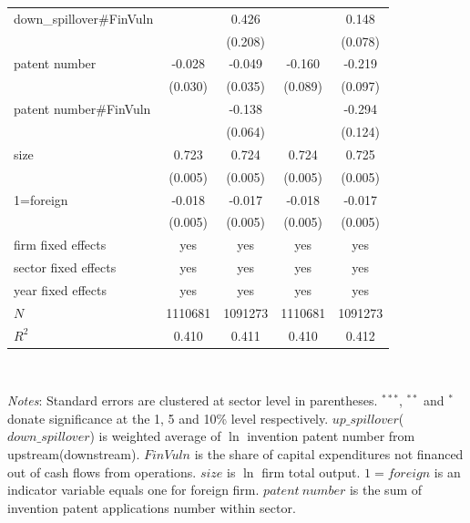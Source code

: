 \documentclass[12pt]{article}%
\begin{document}
\begin{CJK*}{GBK}{fs}
\begin{table}[!h]
{{{\begin{tabular}{l*{4}{c}}
down\_spillover\#FinVuln &            &    0.426\sym{**} &            &     0.148\sym{*} \\

           &            &    (0.208) &            &    (0.078) \\

patent number &     -0.028 &     -0.049 &    -0.160\sym{*} &   -0.219\sym{**} \\

           &    (0.030) &    (0.035) &    (0.089) &    (0.097) \\

patent number\#FinVuln &            &   -0.138\sym{**} &            &   -0.294\sym{**} \\

           &            &    (0.064) &            &    (0.124) \\

      size &   0.723\sym{***} &   0.724\sym{***} &   0.724\sym{***} &   0.725\sym{***} \\

           &    (0.005) &    (0.005) &    (0.005) &    (0.005) \\

 1=foreign &  -0.018\sym{***} &  -0.017\sym{***} &  -0.018\sym{***} &  -0.017\sym{***} \\

           &    (0.005) &    (0.005) &    (0.005) &    (0.005) \\

           \hline
firm fixed effects      &     yes         &       yes&     yes     &      yes\\
sector fixed effects      &     yes         &       yes&     yes     &      yes\\
year fixed effects      &     yes         &       yes&     yes     &      yes\\
\hline
\(N\)       &     1110681 &    1091273 &    1110681 &    1091273 \\
\(R^{2}\)    &0.410 &      0.411 &      0.410 &      0.412 \\
\hline\hline
\end{tabular}
}\\
}
}
\scriptsize {
\par \emph{Notes}: Standard errors are clustered at sector level in parentheses. $^{***}$, $^{**}$ and $^{*}$ donate significance at the 1, 5 and 10\% level respectively. $up\_spillover$($down\_spillover$) is weighted average of $\ln$ invention patent number from upstream(downstream). $FinVuln$ is the share of capital expenditures not financed out of cash flows from operations. $size$ is $\ln$ firm total output. $1=foreign$ is an indicator variable equals one for foreign firm. $patent~number$ is the sum of invention patent applications number within sector.}
\end{table}
\clearpage




\end{CJK*}
\end{document}
